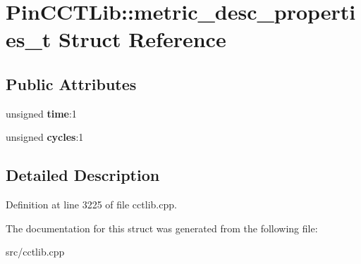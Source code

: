 \hypertarget{structPinCCTLib_1_1metric__desc__properties__t}{\section{Pin\-C\-C\-T\-Lib\-:\-:metric\-\_\-desc\-\_\-properties\-\_\-t Struct Reference}
\label{structPinCCTLib_1_1metric__desc__properties__t}
}
\subsection*{Public Attributes}
\begin{DoxyCompactItemize}
\item 
\hypertarget{structPinCCTLib_1_1metric__desc__properties__t_a1b51a6474166514e6c04e8274daa7ff8}{unsigned {\bfseries time}\-:1}\label{structPinCCTLib_1_1metric__desc__properties__t_a1b51a6474166514e6c04e8274daa7ff8}

\item 
\hypertarget{structPinCCTLib_1_1metric__desc__properties__t_a76ea2cf7e323d5280903d78b22b84921}{unsigned {\bfseries cycles}\-:1}\label{structPinCCTLib_1_1metric__desc__properties__t_a76ea2cf7e323d5280903d78b22b84921}

\end{DoxyCompactItemize}


\subsection{Detailed Description}


Definition at line 3225 of file cctlib.\-cpp.



The documentation for this struct was generated from the following file\-:\begin{DoxyCompactItemize}
\item 
src/cctlib.\-cpp\end{DoxyCompactItemize}

